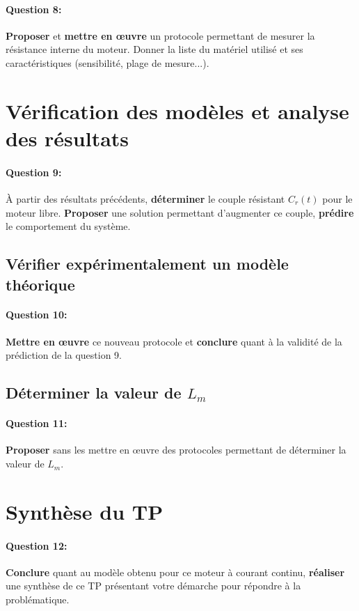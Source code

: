 \paragraph{Question 8:} \textbf{Proposer} et \textbf{mettre en \oe uvre} un protocole permettant de mesurer la résistance interne du moteur. Donner la liste du matériel utilisé et ses caractéristiques (sensibilité, plage de mesure...).

\section{Vérification des modèles et analyse des résultats}

\paragraph{Question 9:} À partir des résultats précédents, \textbf{déterminer} le couple résistant $C_r(t)$ pour le moteur libre. \textbf{Proposer} une solution permettant d'augmenter ce couple, \textbf{prédire} le comportement du système.

\subsection{Vérifier expérimentalement un modèle théorique}

\paragraph{Question 10:} \textbf{Mettre en \oe uvre} ce nouveau protocole et \textbf{conclure} quant à la validité de la prédiction de la question 9.

\subsection{Déterminer la valeur de $L_m$}

\paragraph{Question 11:} \textbf{Proposer} sans les mettre en \oe uvre des protocoles permettant de déterminer la valeur de $L_m$.

\section{Synthèse du TP}

\paragraph{Question 12:} \textbf{Conclure} quant au modèle obtenu pour ce moteur à courant continu, \textbf{réaliser} une synthèse de ce TP présentant votre démarche pour répondre à la problématique.

